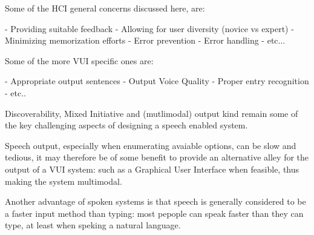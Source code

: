 Some of the HCI general concerns discussed here, are:

-  Providing suitable feedback
-  Allowing for user diversity (novice vs expert)
-  Minimizing memorization efforts
-  Error prevention
-  Error handling
-  etc...

Some of the more VUI specific ones are:

- Appropriate output sentences
- Output Voice Quality
- Proper entry recognition
- etc..

Discoverability, Mixed Initiative and (mutlimodal) output kind remain some of the key challenging aspects of designing a speech enabled system. 

Speech output, especially when enumerating avaiable options, can be slow and tedious, it may therefore be of some benefit to provide an alternative alley for the output of a VUI system: such as a Graphical User Interface when feasible, thus making the system multimodal.

Another advantage of spoken systems is that speech is generally considered to be a faster input method than typing: most pepople can speak faster than they can type, at least when speking a natural language.


